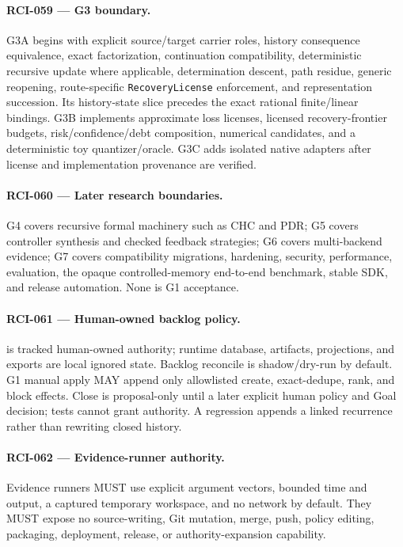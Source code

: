 \documentclass[11pt]{article}
\begin{document}
\paragraph{RCI-059 --- G3 boundary.}
G3A begins with explicit source/target carrier roles, history consequence
equivalence, exact factorization, continuation compatibility, deterministic
recursive update where applicable, determination descent, path residue, generic
reopening, route-specific \texttt{RecoveryLicense} enforcement, and
representation succession. Its history-state slice precedes the exact
rational finite/linear bindings. G3B implements approximate loss licenses,
licensed recovery-frontier budgets, risk/confidence/debt composition, numerical
candidates, and a deterministic toy quantizer/oracle. G3C adds isolated native
adapters after license and implementation provenance are verified.

\paragraph{RCI-060 --- Later research boundaries.}
G4 covers recursive formal machinery such as CHC and PDR; G5 covers controller
synthesis and checked feedback strategies; G6 covers multi-backend evidence;
G7 covers compatibility migrations, hardening, security, performance,
evaluation, the opaque controlled-memory end-to-end benchmark, stable SDK, and
release automation. None is G1 acceptance.

\paragraph{RCI-061 --- Human-owned backlog policy.}
 is tracked human-owned authority; runtime database,
artifacts, projections, and exports are local ignored state. Backlog reconcile
is shadow/dry-run by default. G1 manual apply MAY append only allowlisted
create, exact-dedupe, rank, and block effects. Close is proposal-only until a
later explicit human policy and Goal decision; tests cannot grant authority.
A regression appends a linked recurrence rather than rewriting closed history.

\paragraph{RCI-062 --- Evidence-runner authority.}
Evidence runners MUST use explicit argument vectors, bounded time and output, a
captured temporary workspace, and no network by default. They MUST expose no
source-writing, Git mutation, merge, push, policy editing, packaging,
deployment, release, or authority-expansion capability.
\end{document}
